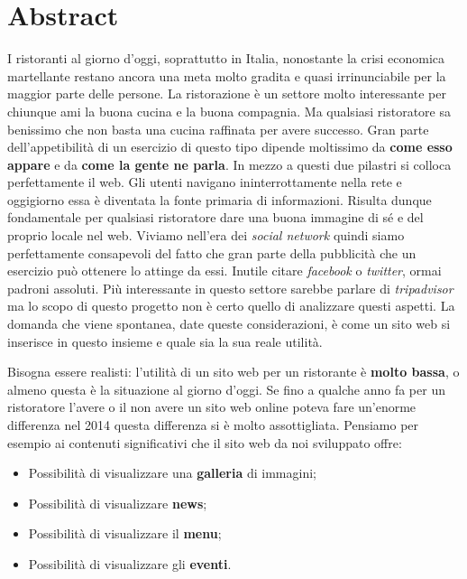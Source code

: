 \section{Abstract}

I ristoranti al giorno d'oggi, soprattutto in Italia, nonostante la crisi economica martellante restano ancora una meta molto gradita e quasi irrinunciabile per la maggior parte delle persone. La ristorazione è un settore molto interessante per chiunque ami la buona cucina e la buona compagnia. Ma qualsiasi ristoratore sa benissimo che non basta una cucina raffinata per avere successo. Gran parte dell'appetibilità di un esercizio di questo tipo dipende moltissimo da \textbf{come esso appare} e da \textbf{come la gente ne parla}. In mezzo a questi due pilastri si colloca perfettamente il web. Gli utenti navigano ininterrottamente nella rete e oggigiorno essa è diventata la fonte primaria di informazioni. Risulta dunque fondamentale per qualsiasi ristoratore dare una buona immagine di sé e del proprio locale nel web. Viviamo nell'era dei \textit{social network} quindi siamo perfettamente consapevoli del fatto che gran parte della pubblicità che un esercizio può ottenere lo attinge da essi. Inutile citare \textit{facebook} o \textit{twitter}, ormai padroni assoluti. Più interessante in questo settore sarebbe parlare di \textit{tripadvisor} ma lo scopo di questo progetto non è certo quello di analizzare questi aspetti. La domanda che viene spontanea, date queste considerazioni, è come un sito web si inserisce in questo insieme e quale sia la sua reale utilità.

Bisogna essere realisti: l'utilità di un sito web per un ristorante è \textbf{molto bassa}, o almeno questa è la situazione al giorno d'oggi. Se fino a qualche anno fa per un ristoratore l'avere o il non avere un sito web online poteva fare un'enorme differenza nel 2014 questa differenza si è molto assottigliata. Pensiamo per esempio ai contenuti significativi che il sito web da noi sviluppato offre:

\begin{itemize}

	\item Possibilità di visualizzare una \textbf{galleria} di immagini;
	\item Possibilità di visualizzare \textbf{news};
	\item Possibilità di visualizzare il \textbf{menu};
	\item Possibilità di visualizzare gli \textbf{eventi}.

\end{itemize}

